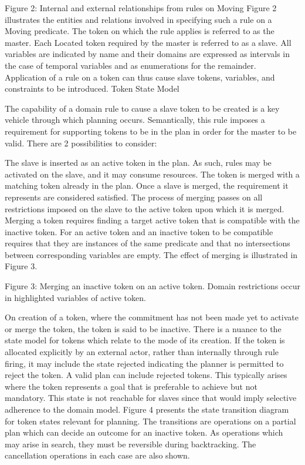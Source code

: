 Figure 2: Internal and external relationships from rules on Moving Figure 2 illustrates the entities and relations involved in specifying such a rule on a Moving predicate. The token on which the rule applies is referred to as the master. Each Located token required by the master is referred to as a slave. All variables are indicated by name and their domains are expressed as intervals in the case of temporal variables and as enumerations for the remainder. Application of a rule on a token can thus cause slave tokens, variables, and constraints to be introduced.
Token State Model

The capability of a domain rule to cause a slave token to be created is a key vehicle through which planning occurs. Semantically, this rule imposes a requirement for supporting tokens to be in the plan in order for the master to be valid. There are 2 possibilities to consider:

    The slave is inserted as an active token in the plan. As such, rules may be activated on the slave, and it may consume resources.
    The token is merged with a matching token already in the plan. Once a slave is merged, the requirement it represents are considered satisfied. The process of merging passes on all restrictions imposed on the slave to the active token upon which it is merged. Merging a token requires finding a target active token that is compatible with the inactive token. For an active token and an inactive token to be compatible requires that they are instances of the same predicate and that no intersections between corresponding variables are empty. The effect of merging is illustrated in Figure 3. 

Figure 3: Merging an inactive token on an active token. Domain restrictions occur in highlighted variables of active token.

On creation of a token, where the commitment has not been made yet to activate or merge the token, the token is said to be inactive. There is a nuance to the state model for tokens which relate to the mode of its creation. If the token is allocated explicitly by an external actor, rather than internally through rule firing, it may include the state rejected indicating the planner is permitted to reject the token. A valid plan can include rejected tokens. This typically arises where the token represents a goal that is preferable to achieve but not mandatory. This state is not reachable for slaves since that would imply selective adherence to the domain model. Figure 4 presents the state transition diagram for token states relevant for planning. The transitions are operations on a partial plan which can decide an outcome for an inactive token. As operations which may arise in search, they must be reversible during backtracking. The cancellation operations in each case are also shown.

